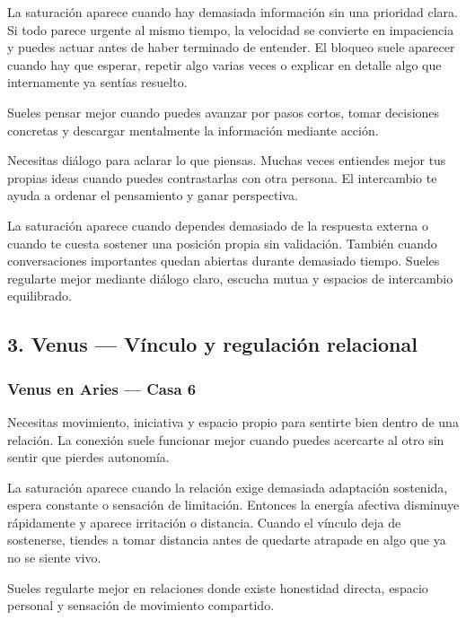 \documentclass[11pt,a4paper]{article}
\begin{document}
La saturación aparece cuando hay demasiada información sin una prioridad clara. Si todo parece urgente al mismo tiempo, la velocidad se convierte en impaciencia y puedes actuar antes de haber terminado de entender. El bloqueo suele aparecer cuando hay que esperar, repetir algo varias veces o explicar en detalle algo que internamente ya sentías resuelto.

Sueles pensar mejor cuando puedes avanzar por pasos cortos, tomar decisiones concretas y descargar mentalmente la información mediante acción.

Necesitas diálogo para aclarar lo que piensas. Muchas veces entiendes mejor tus propias ideas cuando puedes contrastarlas con otra persona. El intercambio te ayuda a ordenar el pensamiento y ganar perspectiva.

La saturación aparece cuando dependes demasiado de la respuesta externa o cuando te cuesta sostener una posición propia sin validación. También cuando conversaciones importantes quedan abiertas durante demasiado tiempo. Sueles regularte mejor mediante diálogo claro, escucha mutua y espacios de intercambio equilibrado.

\vspace{0.8cm}

\subsection{3. Venus — Vínculo y regulación relacional}

\subsubsection*{Venus en Aries — Casa 6}

\justifying
Necesitas movimiento, iniciativa y espacio propio para sentirte bien dentro de una relación. La conexión suele funcionar mejor cuando puedes acercarte al otro sin sentir que pierdes autonomía.

La saturación aparece cuando la relación exige demasiada adaptación sostenida, espera constante o sensación de limitación. Entonces la energía afectiva disminuye rápidamente y aparece irritación o distancia. Cuando el vínculo deja de sostenerse, tiendes a tomar distancia antes de quedarte atrapade en algo que ya no se siente vivo.

Sueles regularte mejor en relaciones donde existe honestidad directa, espacio personal y sensación de movimiento compartido.
\end{document}

